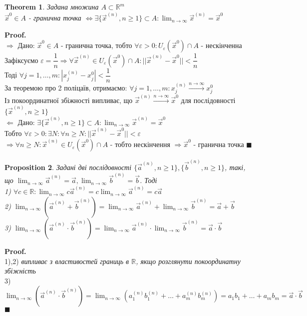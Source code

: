 \documentclass[a4paper, 14pt]{extarticle}
\def\huge{\displaystyle}
\def\bigline{\vspace{5mm}\\}
\def\rightproof{$\boxed{\Rightarrow}$ }
\def\leftproof{$\boxed{\Leftarrow}$ }
\theoremstyle{theoremdd}
\newtheorem{theorem}{Theorem}[subsection]
\theoremstyle{theoremdd}
\theoremstyle{theoremdd}
\newtheorem{proposition}[theorem]{Proposition}
\theoremstyle{theoremdd}
\theoremstyle{theoremdd}
\theoremstyle{theoremdd}
\theoremstyle{theoremdd}
\newenvironment{pf}{\vspace*{-3mm} \textbf{Proof. \\}}{$\blacksquare$}
\begin{document}
\begin{theorem}
Задана множина $A \subset \mathbb{R}^m$\\
$\vec{x}^0 \in A$ - гранична точка $\iff \exists \{\vec{x}^{(n)}, n \geq 1\} \subset A: \huge \lim_{n \to \infty} \vec{x}^{(n)} = \vec{x}^0$\\
\end{theorem}
\begin{pf}
\rightproof Дано: $\vec{x}^0 \in A$ - гранична точка, тобто $\forall \varepsilon > 0: U_{\varepsilon}(\vec{x}^0) \cap A$ - нескінченна\\
Зафіксуємо $\varepsilon = \dfrac{1}{n} \Rightarrow \forall \vec{x}^{(n)} \in U_{\varepsilon}(\vec{x}^0) \cap A: ||\vec{x}^{(n)} - \vec{x}^0|| < \dfrac{1}{n}$\\
Тоді $\forall j = 1,\dots,m: |x_j^{(n)} - x_j^0| < \dfrac{1}{n}$\\
За теоремою про 2 поліцаїв, отримаємо: $\forall j = 1, \dots, m: x_j^{(n)} \overset{n \to \infty}{\to} x_j^0$\\
Із покоординатної збіжності випливає, що $\vec{x}^{(n)} \overset{n \to \infty} \to \vec{x}^0$ для послідовності $\{\vec{x}^{(n)}, n \geq 1\}$
\bigline

\leftproof Дано: $\exists \{\vec{x}^{(n)}, n \geq 1\} \subset A: \huge \lim_{n \to \infty} \vec{x}^{(n)} = \vec{x}^0$\\
Тобто $\forall \varepsilon > 0: \exists N: \forall n \geq N: ||\vec{x}^{(n)} - \vec{x}^0|| < \varepsilon$\\
$\Rightarrow \forall n \geq N: \vec{x}^{(n)} \in U_\varepsilon(\vec{x}^0) \cap A$ - тобто нескінчення $\Rightarrow \vec{x}^{0}$ - гранична точка
\end{pf}

\begin{proposition}
Задані дві послідовності $\{\vec{a}^{(n)}, n \geq 1\}, \{\vec{b}^{(n)}, n \geq 1\}$, такі, що $\huge \lim_{n \to \infty} \vec{a}^{(n)} = \vec{a}, \lim_{n \to \infty} \vec{b}^{(n)} = \vec{b}$. Тоді\\
1) $\forall c \in \mathbb{R}: \huge \lim_{n \to \infty} c \vec{a}^{(n)} = c \lim_{n \to \infty} \vec{a}^{(n)} = c \vec{a}$\\
2) $\huge \lim_{n \to \infty} (\vec{a}^{(n)} + \vec{b}^{(n)}) = \lim_{n \to \infty} \vec{a}^{(n)} + \lim_{n \to \infty} \vec{b}^{(n)} = \vec{a} + \vec{b}$\\
3) $\huge \lim_{n \to \infty} (\vec{a}^{(n)} \cdot \vec{b}^{(n)}) = \lim_{n \to \infty} \vec{a}^{(n)} \cdot \lim_{n \to \infty} \vec{b}^{(n)} = \vec{a} \cdot \vec{b}$
\end{proposition}
\begin{pf}
1),2) \textit{випливає з властивостей границь в $\mathbb{R}$, якщо розглянути покоординатну збіжність}
\bigline
3) $\huge \lim_{n \to \infty} (\vec{a}^{(n)} \cdot \vec{b}^{(n)}) = \lim_{n \to \infty} (a_1^{(n)}b_1^{(n)} + \dots + a_m^{(n)}b_m^{(n)}) = a_1b_1 + \dots + a_m b_m = \vec{a} \cdot \vec{b}$
\end{pf}
\\
\end{document}
